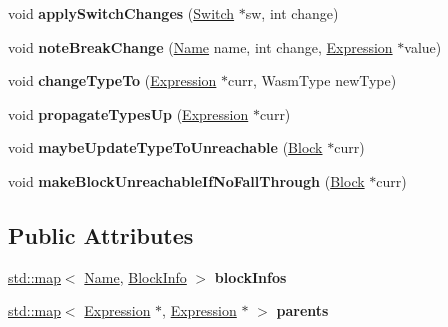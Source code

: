 \begin{DoxyCompactItemize}
\item 
\mbox{\label{structwasm_1_1_type_updater_afe97cd45a81e555f11c9aba169ac62ab}} 
void {\bfseries apply\+Switch\+Changes} (\mbox{\hyperlink{classwasm_1_1_switch}{Switch}} $\ast$sw, int change)
\item 
\mbox{\label{structwasm_1_1_type_updater_a7e71c114165d5885f22423bd7c1222a9}} 
void {\bfseries note\+Break\+Change} (\mbox{\hyperlink{structwasm_1_1_name}{Name}} name, int change, \mbox{\hyperlink{classwasm_1_1_expression}{Expression}} $\ast$value)
\item 
\mbox{\label{structwasm_1_1_type_updater_aa07f9e401d582a1d30509925e790b62a}} 
void {\bfseries change\+Type\+To} (\mbox{\hyperlink{classwasm_1_1_expression}{Expression}} $\ast$curr, Wasm\+Type new\+Type)
\item 
\mbox{\label{structwasm_1_1_type_updater_ae4ce5f269958c4206f3ef879010e1ca2}} 
void {\bfseries propagate\+Types\+Up} (\mbox{\hyperlink{classwasm_1_1_expression}{Expression}} $\ast$curr)
\item 
\mbox{\label{structwasm_1_1_type_updater_a334bf0eed19f61129f7dbeb5cc23bc02}} 
void {\bfseries maybe\+Update\+Type\+To\+Unreachable} (\mbox{\hyperlink{classwasm_1_1_block}{Block}} $\ast$curr)
\item 
\mbox{\label{structwasm_1_1_type_updater_a18fd25b7bde933484a9f4b3b2be765f8}} 
void {\bfseries make\+Block\+Unreachable\+If\+No\+Fall\+Through} (\mbox{\hyperlink{classwasm_1_1_block}{Block}} $\ast$curr)
\end{DoxyCompactItemize}
\subsection*{Public Attributes}
\begin{DoxyCompactItemize}
\item 
\mbox{\label{structwasm_1_1_type_updater_a0d189b82ad41a969bfed0ef001f0798a}} 
\mbox{\hyperlink{classstd_1_1map}{std\+::map}}$<$ \mbox{\hyperlink{structwasm_1_1_name}{Name}}, \mbox{\hyperlink{structwasm_1_1_type_updater_1_1_block_info}{Block\+Info}} $>$ {\bfseries block\+Infos}
\item 
\mbox{\label{structwasm_1_1_type_updater_a21b8474f77e761cfaafff0514f90ac3b}} 
\mbox{\hyperlink{classstd_1_1map}{std\+::map}}$<$ \mbox{\hyperlink{classwasm_1_1_expression}{Expression}} $\ast$, \mbox{\hyperlink{classwasm_1_1_expression}{Expression}} $\ast$ $>$ {\bfseries parents}
\end{DoxyCompactItemize}
